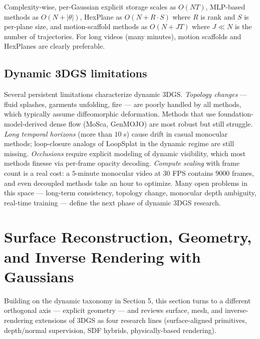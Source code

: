 Complexity-wise, per-Gaussian explicit storage scales as \(O(NT)\), MLP-based methods as \(O(N + |\theta|)\), HexPlane as \(O(N + R\cdot S)\) where \(R\) is rank and \(S\) is per-plane size, and motion-scaffold methods as \(O(N + JT)\) where \(J\ll N\) is the number of trajectories. For long videos (many minutes), motion scaffolds and HexPlanes are clearly preferable.

\subsection{Dynamic 3DGS limitations}\label{dynamic-3dgs-limitations}

Several persistent limitations characterize dynamic 3DGS. \emph{Topology changes} --- fluid splashes, garments unfolding, fire --- are poorly handled by all methods, which typically assume diffeomorphic deformation. Methods that use foundation-model-derived dense flow (MoSca, GenMOJO) are most robust but still struggle. \emph{Long temporal horizons} (more than \(10\) s) cause drift in casual monocular methods; loop-closure analogs of LoopSplat in the dynamic regime are still missing. \emph{Occlusions} require explicit modeling of dynamic visibility, which most methods finesse via per-frame opacity decoding. \emph{Compute scaling} with frame count is a real cost: a \(5\)-minute monocular video at \(30\) FPS contains \(9000\) frames, and even decoupled methods take an hour to optimize. Many open problems in this space --- long-term consistency, topology change, monocular depth ambiguity, real-time training --- define the next phase of dynamic 3DGS research.

\section{Surface Reconstruction, Geometry, and Inverse Rendering with Gaussians}\label{surface-reconstruction-geometry-and-inverse-rendering-with-gaussians}

Building on the dynamic taxonomy in Section 5, this section turns to a different orthogonal axis --- explicit geometry --- and reviews surface, mesh, and inverse-rendering extensions of 3DGS as four research lines (surface-aligned primitives, depth/normal supervision, SDF hybrids, physically-based rendering).

